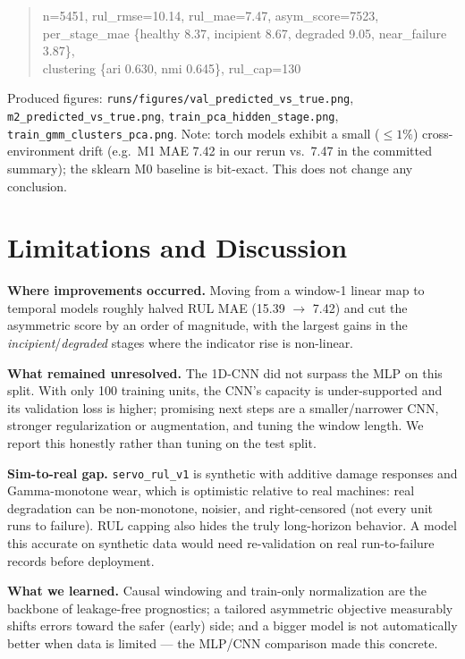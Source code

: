 \documentclass[11pt,a4paper]{article}
\newcommand{\code}[1]{\texttt{\small #1}}
\begin{document}
\begin{quote}\small\ttfamily
n=5451, rul\_rmse=10.14, rul\_mae=7.47, asym\_score=7523,\\
per\_stage\_mae \{healthy 8.37, incipient 8.67, degraded 9.05, near\_failure 3.87\},\\
clustering \{ari 0.630, nmi 0.645\}, rul\_cap=130
\end{quote}

Produced figures: \code{runs/figures/val\_predicted\_vs\_true.png},
\code{m2\_predicted\_vs\_true.png}, \code{train\_pca\_hidden\_stage.png},
\code{train\_gmm\_clusters\_pca.png}. Note: torch models exhibit a small
($\le 1\%$) cross-environment drift (e.g.\ M1 MAE 7.42 in our rerun vs.\ 7.47 in
the committed summary); the sklearn M0 baseline is bit-exact. This does not
change any conclusion.

\section{Limitations and Discussion}

\textbf{Where improvements occurred.} Moving from a window-1 linear map to
temporal models roughly halved RUL MAE (15.39 $\to$ 7.42) and cut the
asymmetric score by an order of magnitude, with the largest gains in the
\emph{incipient}/\emph{degraded} stages where the indicator rise is non-linear.

\textbf{What remained unresolved.} The 1D-CNN did not surpass the MLP on this
split. With only 100 training units, the CNN's capacity is under-supported and
its validation loss is higher; promising next steps are a smaller/narrower CNN,
stronger regularization or augmentation, and tuning the window length. We report
this honestly rather than tuning on the test split.

\textbf{Sim-to-real gap.} \code{servo\_rul\_v1} is synthetic with additive
damage responses and Gamma-monotone wear, which is optimistic relative to real
machines: real degradation can be non-monotone, noisier, and right-censored (not
every unit runs to failure). RUL capping also hides the truly long-horizon
behavior. A model this accurate on synthetic data would need re-validation on
real run-to-failure records before deployment.

\textbf{What we learned.} Causal windowing and train-only normalization are the
backbone of leakage-free prognostics; a tailored asymmetric objective measurably
shifts errors toward the safer (early) side; and a bigger model is not
automatically better when data is limited --- the MLP/CNN comparison made this
concrete.
\end{document}
